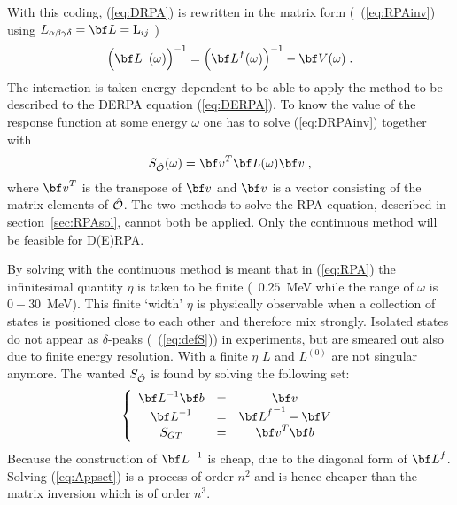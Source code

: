 With this coding, (\ref{eq:DRPA}) is rewritten in the matrix form (\cf\ 
(\ref{eq:RPAinv})
 using $L_{\alpha \beta\gamma\delta}=\rvec{L}=\wveci{L}_{ij}$ 
\etc)
%
	\begin{equation}
		\left(\rvec{L}^{\phantom{f}}(\omega)\right)^{-1}
	= 
		\left(\rvec{L}^f(\omega)\right)^{-1}
	- 
		\rvec{V}(\omega)
	\label{eq:DRPAinv}
	\;.
	\end{equation}
%
The interaction is taken energy-dependent to be able to apply the method to be
described to
the DERPA equation (\ref{eq:DERPA}).
To know the value of the response function at some energy $\omega$ one 
has to solve (\ref{eq:DRPAinv}) together with
%
	\begin{equation}
		S_\opO(\omega) 
	= 
		\rvec{v}^T
		\rvec{L}(\omega) 
		\rvec{v}
	\;,
	\end{equation}
%
where $\rvec{v}^T$ is the transpose of $\rvec{v}$ and $\rvec{v}$ is a vector 
consisting of the matrix elements of $\opO$.
The two methods to solve the RPA equation, 
described in section~\ref{sec:RPAsol}, cannot both be applied.
Only the continuous method will be feasible for D(E)RPA.

%
%
By solving with the continuous method is meant that in (\ref{eq:RPA}) the 
infinitesimal quantity $\eta$ is taken to be finite (\eg\ $0.25$~MeV 
while the range 
of $\omega$ is $0-30$~MeV). This finite `width' $\eta$ is physically observable
when a collection of states is positioned close to each other and therefore 
mix strongly. Isolated states do not appear as $\delta$-peaks (\cf\ 
(\ref{eq:defS})) in experiments, 
but are smeared out also due to finite energy resolution. With a
finite $\eta$ $L$ and $L^{(0)}$ are not singular anymore. 
The wanted $S_\opO$ is found by
solving the following set:
%
	\begin{equation}
		\left\{
		\begin{array}{ccc}
		\rvec{L}^{-1}\rvec{b} & = & \rvec{v}     \\
		\rvec{L}^{-1}         & = & {\rvec{L}^f}^{-1}-\rvec{V}     \\
		S_{GT}                & = & \rvec{v}^T \rvec{b}
		\end{array}
	\right.
	\label{eq:Appset}
	\end{equation}
%
Because the construction of $\rvec{L}^{-1}$ is cheap, due to the diagonal form 
of $\rvec{L}^f$. Solving (\ref{eq:Appset}) is a process of order $n^2$ 
and is hence cheaper than the matrix inversion which is of order $n^3$.

\refrncs
